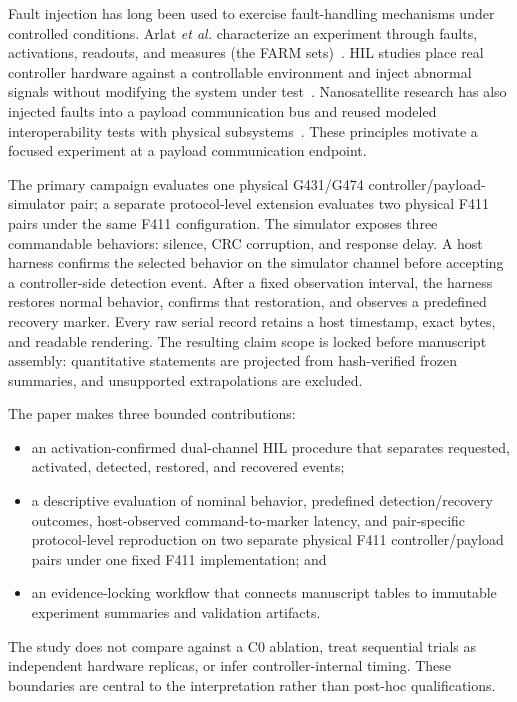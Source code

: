\documentclass[conference]{IEEEtran}
\begin{document}
Fault injection has long been used to exercise fault-handling mechanisms under controlled conditions. Arlat \emph{et al.} characterize an experiment through faults, activations, readouts, and measures (the FARM sets)~\cite{arlat1990}. HIL studies place real controller hardware against a controllable environment and inject abnormal signals without modifying the system under test~\cite{abboush2022,abboush2024}. Nanosatellite research has also injected faults into a payload communication bus and reused modeled interoperability tests with physical subsystems~\cite{batista2019,conceicao2025}. These principles motivate a focused experiment at a payload communication endpoint.

The primary campaign evaluates one physical G431/G474 controller/payload-simulator pair; a separate protocol-level extension evaluates two physical F411 pairs under the same F411 configuration. The simulator exposes three commandable behaviors: silence, CRC corruption, and response delay. A host harness confirms the selected behavior on the simulator channel before accepting a controller-side detection event. After a fixed observation interval, the harness restores normal behavior, confirms that restoration, and observes a predefined recovery marker. Every raw serial record retains a host timestamp, exact bytes, and readable rendering. The resulting claim scope is locked before manuscript assembly: quantitative statements are projected from hash-verified frozen summaries, and unsupported extrapolations are excluded.

The paper makes three bounded contributions:

\begin{itemize}
  \item an activation-confirmed dual-channel HIL procedure that separates requested, activated, detected, restored, and recovered events;
  \item a descriptive evaluation of nominal behavior, predefined detection/recovery outcomes, host-observed command-to-marker latency, and pair-specific protocol-level reproduction on two separate physical F411 controller/payload pairs under one fixed F411 implementation; and
  \item an evidence-locking workflow that connects manuscript tables to immutable experiment summaries and validation artifacts.
\end{itemize}

The study does not compare against a C0 ablation, treat sequential trials as independent hardware replicas, or infer controller-internal timing. These boundaries are central to the interpretation rather than post-hoc qualifications.
\end{document}

